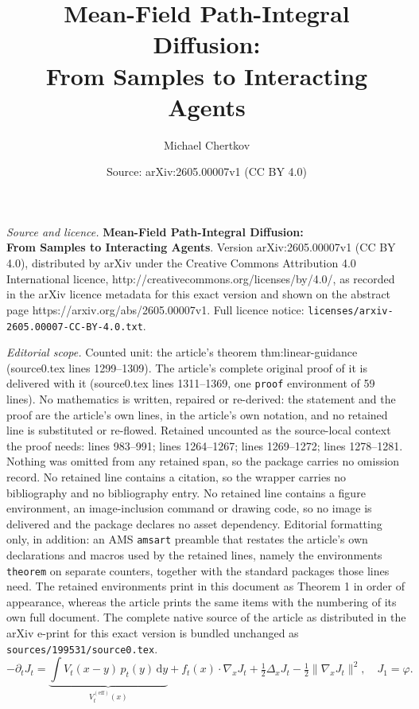 \documentclass[10pt,a4paper]{amsart}
\title{\textbf{Mean-Field Path-Integral Diffusion:\\ From Samples to Interacting Agents}}
\author{Michael Chertkov}
\date{Source: arXiv:2605.00007v1 (CC BY 4.0)}
\newcommand{\Veff}{V^{(\mathrm{eff})}}
\newcommand{\dd}{\mathrm{d}}
\begin{document}
\maketitle

\noindent\emph{Source and licence.} \textbf{Mean-Field Path-Integral Diffusion:\\ From Samples to Interacting Agents}. Version arXiv:2605.00007v1 (CC BY 4.0), distributed by arXiv under the Creative Commons Attribution 4.0 International licence, http://creativecommons.org/licenses/by/4.0/, as recorded in the arXiv licence metadata for this exact version and shown on the abstract page https://arxiv.org/abs/2605.00007v1. Full licence notice: \texttt{licenses/arxiv-2605.00007-CC-BY-4.0.txt}.\par\smallskip

\noindent\textit{Editorial scope.} Counted unit: the article's theorem thm:linear-guidance (source0.tex lines 1299--1309). The article's complete original proof of it is delivered with it (source0.tex lines 1311--1369, one \texttt{proof} environment of 59 lines). No mathematics is written, repaired or re-derived: the statement and the proof are the article's own lines, in the article's own notation, and no retained line is substituted or re-flowed.  Retained uncounted as the source-local context the proof needs: lines 983--991; lines 1264--1267; lines 1269--1272; lines 1278--1281.  Nothing was omitted from any retained span, so the package carries no omission record.  No retained line contains a citation, so the wrapper carries no bibliography and no bibliography entry.  No retained line contains a figure environment, an image-inclusion command or drawing code, so no image is delivered and the package declares no asset dependency.  Editorial formatting only, in addition: an AMS \texttt{amsart} preamble that restates the article's own declarations and macros used by the retained lines, namely the environments \texttt{theorem} on separate counters, together with the standard packages those lines need.  The retained environments print in this document as Theorem 1 in order of appearance, whereas the article prints the same items with the numbering of its own full document.  The complete native source of the article as distributed in the arXiv e-print for this exact version is bundled unchanged as \texttt{sources/199531/source0.tex}.
\begin{equation}
  -\partial_t J_t
  = \underbrace{\int V_t(x-y)\,p_t(y)\,\dd y}_{\Veff_t(x)}
    + f_t(x)\cdot\nabla_x J_t
    + \tfrac{1}{2}\Delta_x J_t
    - \tfrac{1}{2}\|\nabla_x J_t\|^2,
  \quad J_1 = \varphi.
  \label{SI:eq:hjb-mf}
\end{equation}
\end{document}
